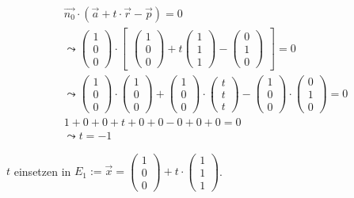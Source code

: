 \begin{gather}
\vec{n_0} \cdot (\vec{a}+t\cdot \vec{r}-\vec{p})=0\\
\leadsto 
\begin{pmatrix}
1\\0\\0
\end{pmatrix} \cdot 
\begin{bmatrix}
\begin{pmatrix}
1\\0\\0
\end{pmatrix}
+ t
\begin{pmatrix}
1\\1\\1
\end{pmatrix}
-
\begin{pmatrix}
0\\1\\0
\end{pmatrix}
\end{bmatrix} = 0\\
\leadsto
\begin{pmatrix}
1\\0\\0
\end{pmatrix}\cdot
\begin{pmatrix}
1\\0\\0
\end{pmatrix}
+
\begin{pmatrix}
1\\0\\0
\end{pmatrix}
\cdot
\begin{pmatrix}
t\\t\\t
\end{pmatrix}
-
\begin{pmatrix}
1\\0\\0
\end{pmatrix}
\cdot
\begin{pmatrix}
0\\1\\0
\end{pmatrix} =0\\
1+0+0+t+0+0-0+0+0=0\\
\leadsto t=-1
\end{gather}

\ensuremath{t} einsetzen in \ensuremath{E_1:= \vec{x}=\begin{pmatrix}
		1\\0\\0
	\end{pmatrix} +t\cdot\begin{pmatrix}
		1\\1\\1
\end{pmatrix}}.\\

